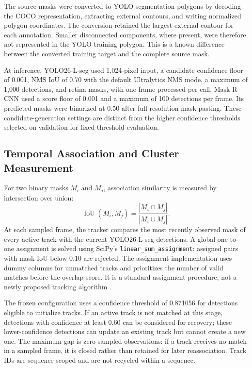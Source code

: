 \documentclass[11pt,a4paper]{article}
\begin{document}
The source masks were converted to YOLO segmentation polygons by decoding the COCO representation, extracting external contours, and writing normalized polygon coordinates. The conversion retained the largest external contour for each annotation. Smaller disconnected components, where present, were therefore not represented in the YOLO training polygon. This is a known difference between the converted training target and the complete source mask.

At inference, YOLO26-L-seg used 1,024-pixel input, a candidate confidence floor of 0.001, NMS IoU of 0.70 with the default Ultralytics NMS mode, a maximum of 1,000 detections, and retina masks, with one frame processed per call. Mask R-CNN used a score floor of 0.001 and a maximum of 100 detections per frame. Its predicted masks were binarized at 0.50 after full-resolution mask pasting. These candidate-generation settings are distinct from the higher confidence thresholds selected on validation for fixed-threshold evaluation.

\subsection{Temporal Association and Cluster Measurement}

For two binary masks $M_i$ and $M_j$, association similarity is measured by intersection over union:
\begin{equation}
\operatorname{IoU}(M_i,M_j)=\frac{|M_i\cap M_j|}{|M_i\cup M_j|}.
\end{equation}
At each sampled frame, the tracker compares the most recently observed mask of every active track with the current YOLO26-L-seg detections. A global one-to-one assignment is solved using SciPy's \texttt{linear\_sum\_assignment}; assigned pairs with mask IoU below 0.10 are rejected. The assignment implementation uses dummy columns for unmatched tracks and prioritizes the number of valid matches before the overlap score. It is a standard assignment procedure, not a newly proposed tracking algorithm \cite{kuhn,scipy}.

The frozen configuration uses a confidence threshold of 0.871056 for detections eligible to initialize tracks. If an active track is not matched at this stage, detections with confidence at least 0.60 can be considered for recovery; these lower-confidence detections can update an existing track but cannot create a new one. The maximum gap is zero sampled observations: if a track receives no match in a sampled frame, it is closed rather than retained for later reassociation. Track IDs are sequence-scoped and are not recycled within a sequence.
\end{document}

